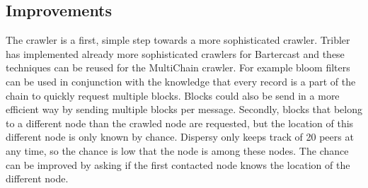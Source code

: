 \subsection{Improvements}
The crawler is a first, simple step towards a more sophisticated crawler.
Tribler has implemented already more sophisticated crawlers for Bartercast
and these techniques can be reused for the MultiChain crawler.
For example bloom filters can be used in conjunction with the knowledge
that every record is a part of the chain to quickly request multiple blocks\cite{broder-bloomfilter}\cite{logiotatidis-splash}.
Blocks could also be send in a more efficient way by sending multiple blocks per message.
Secondly, blocks that belong to a different node than the crawled node are requested,
but the location of this different node is only known by chance.
Dispersy only keeps track of 20 peers at any time, so the chance is low that the node is among these nodes.
The chance can be improved by asking if the first contacted node knows the location of the different node.


